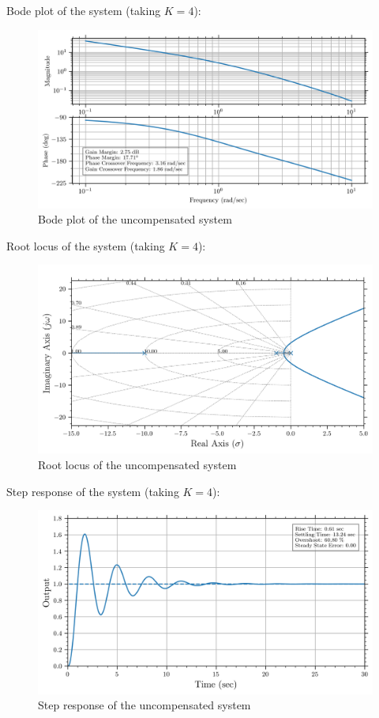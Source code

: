 \documentclass[12pt]{article}
\begin{document}
Bode plot of the system (taking $K=4$):
\begin{figure}[h!]
    \centering
    \includegraphics[width=0.8\linewidth]{bode_uncompensated.png}
    \caption {Bode plot of the uncompensated system}
    \label{fig:bode_uncompensated}
\end{figure}

Root locus of the system (taking $K=4$):
\begin{figure}[h!]
    \centering
    \includegraphics[width=0.8\linewidth]{rootlocus_uncompensated.png}
    \caption {Root locus of the uncompensated system}
    \label{fig:root_locus_uncompensated}
\end{figure}

\clearpage

Step response of the system (taking $K=4$):
\begin{figure}[h!]
    \centering
    \includegraphics[width=0.8\linewidth]{step_response_uncompensated.png}
    \caption {Step response of the uncompensated system}
    \label{fig:step_uncompensated}
\end{figure}
\end{document}
